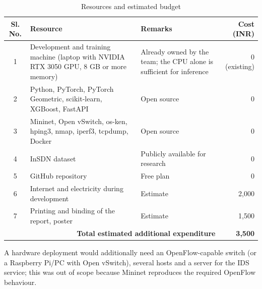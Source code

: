 \begin{appendices}
\begin{table}[htbp]
\centering
\caption{Resources and estimated budget}
\label{tab:budget}
\small
\begin{tabularx}{\textwidth}{|c|p{5.2cm}|X|r|}
\hline
\textbf{Sl. No.} & \textbf{Resource} & \textbf{Remarks} & \textbf{Cost (INR)} \\ \hline
1 & Development and training machine (laptop with NVIDIA RTX 3050 GPU, 8 GB or more memory) & Already owned by the team; the CPU alone is sufficient for inference & 0 (existing) \\ \hline
2 & Python, PyTorch, PyTorch Geometric, scikit-learn, XGBoost, FastAPI & Open source & 0 \\ \hline
3 & Mininet, Open vSwitch, os-ken, hping3, nmap, iperf3, tcpdump, Docker & Open source & 0 \\ \hline
4 & InSDN dataset & Publicly available for research & 0 \\ \hline
5 & GitHub repository & Free plan & 0 \\ \hline
6 & Internet and electricity during development & Estimate & 2,000 \\ \hline
7 & Printing and binding of the report, poster & Estimate & 1,500 \\ \hline
\multicolumn{3}{|r|}{\textbf{Total estimated additional expenditure}} & \textbf{3,500} \\ \hline
\end{tabularx}
\end{table}

A hardware deployment would additionally need an OpenFlow-capable switch (or a Raspberry Pi/PC with Open vSwitch), several hosts and a server for the IDS service; this was out of scope because Mininet reproduces the required OpenFlow behaviour.



\end{appendices}
